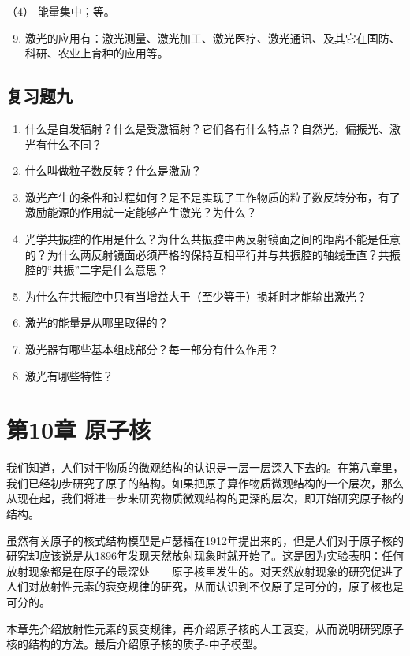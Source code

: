 （4） 能量集中；等。

\begin{enumerate}
\setcounter{enumi}{8}
\item
  激光的应用有：激光测量、激光加工、激光医疗、激光通讯、及其它在国防、科研、农业上育种的应用等。
\end{enumerate}

\section{复习题九}

\begin{enumerate}
\item
  什么是自发辐射？什么是受激辐射？它们各有什么特点？自然光，偏振光、激光有什么不同？
\item
  什么叫做粒子数反转？什么是激励？
\item
  激光产生的条件和过程如何？是不是实现了工作物质的粒子数反转分布，有了激励能源的作用就一定能够产生激光？为什么？
\item
  光学共振腔的作用是什么？为什么共振腔中两反射镜面之间的距离不能是任意的？为什么两反射镜面必须严格的保持互相平行并与共振腔的轴线垂直？共振腔的``共振''二字是什么意思？
\item
  为什么在共振腔中只有当增益大于（至少等于）损耗时才能输出激光？
\item
  激光的能量是从哪里取得的？
\item
  激光器有哪些基本组成部分？每一部分有什么作用？
\item
  激光有哪些特性？
\end{enumerate}

\chapter{第10章 原子核}

我们知道，人们对于物质的微观结构的认识是一层一层深入下去的。在第八章里，我们已经初步研究了原子的结构。如果把原子算作物质微观结构的一个层次，那么从现在起，我们将进一步来研究物质微观结构的更深的层次，即开始研究原子核的结构。

虽然有关原子的核式结构模型是卢瑟福在1912年提出来的，但是人们对于原子核的研究却应该说是从1896年发现天然放射现象时就开始了。这是因为实验表明：任何放射现象都是在原子的最深处------原子核里发生的。对天然放射现象的研究促进了人们对放射性元素的衰变规律的研究，从而认识到不仅原子是可分的，原子核也是可分的。

本章先介绍放射性元素的衰变规律，再介绍原子核的人工衰变，从而说明研究原子核的结构的方法。最后介绍原子核的质子-中子模型。

